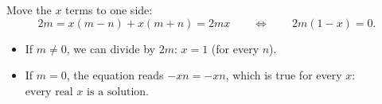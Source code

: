 Move the $x$ terms to one side:
\[
2m=x(m-n)+x(m+n)=2mx\qquad\Longleftrightarrow\qquad 2m(1-x)=0 .
\]
\begin{itemize}
\item If $m\ne0$, we can divide by $2m$: $\boxed{x=1}$ (for every $n$).
\item If $m=0$, the equation reads $-xn=-xn$, which is true for every $x$: $\boxed{\text{every real }x\text{ is a solution}}$.
\end{itemize}
